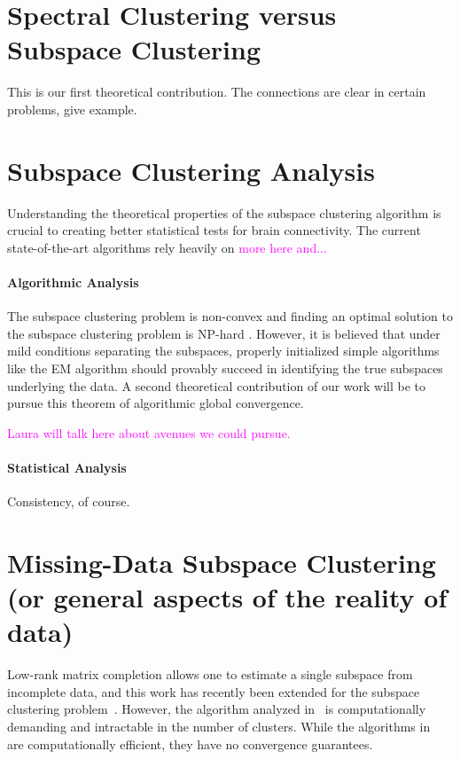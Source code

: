 \documentclass[times,11pt]{article} %
\newcommand{\laura}{\textcolor{magenta}}
\begin{document}
\section{Spectral Clustering versus Subspace Clustering}

This is our first theoretical contribution. The connections are clear in certain problems, give example.

\section{Subspace Clustering Analysis} Understanding the theoretical properties of the subspace clustering algorithm is crucial to creating better statistical tests for brain connectivity. The current state-of-the-art algorithms rely heavily on \laura{more here and...}


\paragraph{Algorithmic Analysis} The subspace clustering problem is non-convex and finding an optimal solution to the subspace clustering problem is NP-hard \cite{vidaltutorial}. However, it is believed that under mild conditions separating the subspaces, properly initialized simple algorithms like the EM algorithm should provably succeed in identifying the true subspaces underlying the data. A second theoretical contribution of our work will be to pursue this theorem of algorithmic global convergence.

\laura{Laura will talk here about avenues we could pursue. }

\paragraph{Statistical Analysis} Consistency, of course.



\section{Missing-Data Subspace Clustering (or general aspects of the reality of data)}


Low-rank matrix completion allows one to estimate a single subspace from incomplete data, and this work has recently been extended for the subspace clustering problem~\cite{hrmc, balzano2012ssp, pimentel2014}. However, the algorithm analyzed in~\cite{hrmc} is computationally demanding and intractable in the number of clusters. While the algorithms in~\cite{balzano2012ssp, pimentel2014} are computationally efficient, they have no convergence guarantees. 
\end{document}

